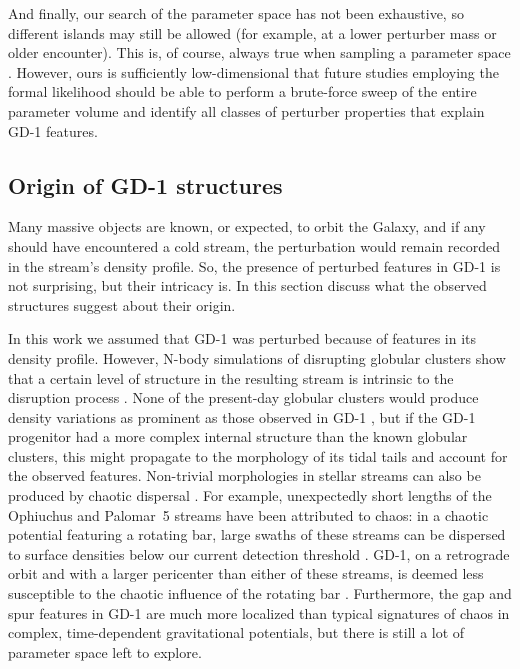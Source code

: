 \documentclass[twocolumn]{aastex62}
\begin{document}
And finally, our search of the parameter space has not been exhaustive, so different islands may still be allowed (for example, at a lower perturber mass or older encounter).
This is, of course, always true when sampling a parameter space \citep[appropriate mcmc reference][]{}.
However, ours is sufficiently low-dimensional that future studies employing the formal likelihood should be able to perform a brute-force sweep of the entire parameter volume and identify all classes of perturber properties that explain GD-1 features.

\subsection{Origin of GD-1 structures}
\label{sec:origin}
Many massive objects are known, or expected, to orbit the Galaxy, and if any should have encountered a cold stream, the perturbation would remain recorded in the stream's density profile.
So, the presence of perturbed features in GD-1 is not surprising, but their intricacy is.
In this section discuss what the observed structures suggest about their origin.

In this work we assumed that GD-1 was perturbed because of features in its density profile.
However, N-body simulations of disrupting globular clusters show that a certain level of structure in the resulting stream is intrinsic to the disruption process \citep[e.g.,][]{kupper2008,kupper2010}.
None of the present-day globular clusters would produce density variations as prominent as those observed in GD-1 \citep[see][]{pwb}, but if the GD-1 progenitor had a more complex internal structure than the known globular clusters, this might propagate to the morphology of its tidal tails and account for the observed features.
Non-trivial morphologies in stellar streams can also be produced by chaotic dispersal \citep{pw2016}.
For example, unexpectedly short lengths of the Ophiuchus and Palomar~5 streams have been attributed to chaos: in a chaotic potential featuring a rotating bar, large swaths of these streams can be dispersed to surface densities below our current detection threshold \citep{pw2016b,pearson2017}.
GD-1, on a retrograde orbit and with a larger pericenter than either of these streams, is deemed less susceptible to the chaotic influence of the rotating bar \citep{bb2018}.
Furthermore, the gap and spur features in GD-1 are much more localized than typical signatures of chaos in complex, time-dependent gravitational potentials, but there is still a lot of parameter space left to explore.
\end{document}
